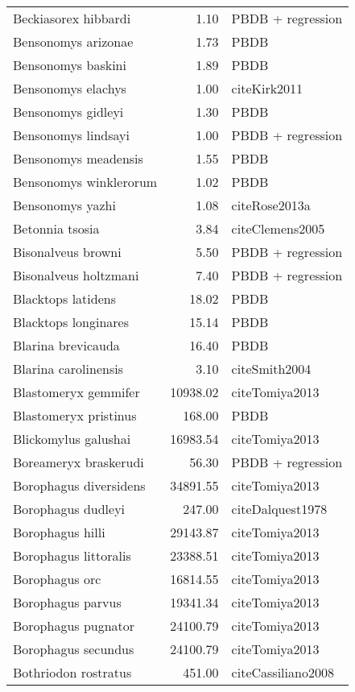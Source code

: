 \begin{table}[ht]
\begin{tabular}{lrl}
  Beckiasorex hibbardi & 1.10 & PBDB + regression \\ 
  Bensonomys arizonae & 1.73 & PBDB \\ 
  Bensonomys baskini & 1.89 & PBDB \\ 
  Bensonomys elachys & 1.00 & cite{Kirk2011} \\ 
  Bensonomys gidleyi & 1.30 & PBDB \\ 
  Bensonomys lindsayi & 1.00 & PBDB + regression \\ 
  Bensonomys meadensis & 1.55 & PBDB \\ 
  Bensonomys winklerorum & 1.02 & PBDB \\ 
  Bensonomys yazhi & 1.08 & cite{Rose2013a} \\ 
  Betonnia tsosia & 3.84 & cite{Clemens2005} \\ 
  Bisonalveus browni & 5.50 & PBDB + regression \\ 
  Bisonalveus holtzmani & 7.40 & PBDB + regression \\ 
  Blacktops latidens & 18.02 & PBDB \\ 
  Blacktops longinares & 15.14 & PBDB \\ 
  Blarina brevicauda & 16.40 & PBDB \\ 
  Blarina carolinensis & 3.10 & cite{Smith2004} \\ 
  Blastomeryx gemmifer & 10938.02 & cite{Tomiya2013} \\ 
  Blastomeryx pristinus & 168.00 & PBDB \\ 
  Blickomylus galushai & 16983.54 & cite{Tomiya2013} \\ 
  Boreameryx braskerudi & 56.30 & PBDB + regression \\ 
  Borophagus diversidens & 34891.55 & cite{Tomiya2013} \\ 
  Borophagus dudleyi & 247.00 & cite{Dalquest1978} \\ 
  Borophagus hilli & 29143.87 & cite{Tomiya2013} \\ 
  Borophagus littoralis & 23388.51 & cite{Tomiya2013} \\ 
  Borophagus orc & 16814.55 & cite{Tomiya2013} \\ 
  Borophagus parvus & 19341.34 & cite{Tomiya2013} \\ 
  Borophagus pugnator & 24100.79 & cite{Tomiya2013} \\ 
  Borophagus secundus & 24100.79 & cite{Tomiya2013} \\ 
  Bothriodon rostratus & 451.00 & cite{Cassiliano2008} \\ 

\end{tabular}
\end{table}
